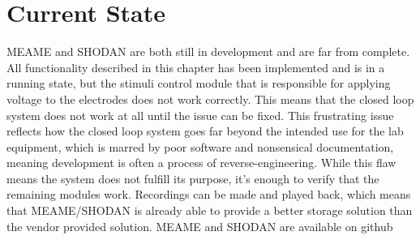 \section{Current State}
MEAME and SHODAN are both still in development and are far from complete.
All functionality described in this chapter has been implemented and is in a
running state, but the stimuli control module that is responsible for applying
voltage to the electrodes does not work correctly.
This means that the closed loop system does not work at all until the issue can
be fixed.
This frustrating issue reflects how the closed loop system goes far beyond the
intended use for the lab equipment, which is marred by poor software and
nonsensical documentation, meaning development is often a process of
reverse-engineering.
While this flaw means the system does not fulfill its purpose, it's enough to
verify that the remaining modules work.
Recordings can be made and played back, which means that MEAME/SHODAN is already
able to provide a better storage solution than the vendor provided solution.
MEAME and SHODAN are available on github
\cite{MEAME_github}\cite{SHODAN_github}\cite{MEAME_DSP_github}
